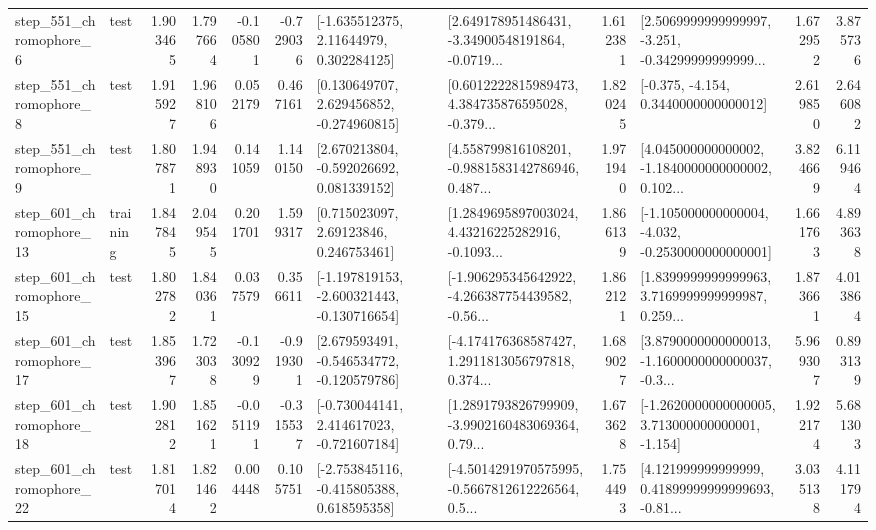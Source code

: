 \begin{tabular}{llrrrrllrlrr}
   step\_551\_chromophore\_6 &      test &      1.903465 &    1.797664 &     -0.105801 & -0.729036 &     [-1.635512375, 2.11644979, 0.302284125] &  [2.649178951486431, -3.34900548191864, -0.0719... &       1.612381 &  [2.5069999999999997, -3.251, -0.34299999999999... &            1.672952 &          3.875736 \\
   step\_551\_chromophore\_8 &      test &      1.915927 &    1.968106 &      0.052179 &  0.467161 &    [0.130649707, 2.629456852, -0.274960815] &  [0.6012222815989473, 4.384735876595028, -0.379... &       1.820245 &               [-0.375, -4.154, 0.3440000000000012] &            2.619850 &          2.646082 \\
   step\_551\_chromophore\_9 &      test &      1.807871 &    1.948930 &      0.141059 &  1.140150 &    [2.670213804, -0.592026692, 0.081339152] &  [4.558799816108201, -0.9881583142786946, 0.487... &       1.971940 &  [4.045000000000002, -1.1840000000000002, 0.102... &            3.824669 &          6.119464 \\
  step\_601\_chromophore\_13 &  training &      1.847845 &    2.049545 &      0.201701 &  1.599317 &      [0.715023097, 2.69123846, 0.246753461] &  [1.2849695897003024, 4.43216225282916, -0.1093... &       1.866139 &  [-1.105000000000004, -4.032, -0.2530000000000001] &            1.661763 &          4.893638 \\
  step\_601\_chromophore\_15 &      test &      1.802782 &    1.840361 &      0.037579 &  0.356611 &  [-1.197819153, -2.600321443, -0.130716654] &  [-1.906295345642922, -4.266387754439582, -0.56... &       1.862121 &  [1.8399999999999963, 3.7169999999999987, 0.259... &            1.873661 &          4.013864 \\
  step\_601\_chromophore\_17 &      test &      1.853967 &    1.723038 &     -0.130929 & -0.919301 &   [2.679593491, -0.546534772, -0.120579786] &  [-4.174176368587427, 1.2911813056797818, 0.374... &       1.689027 &  [3.8790000000000013, -1.1600000000000037, -0.3... &            5.969307 &          0.893139 \\
  step\_601\_chromophore\_18 &      test &      1.902812 &    1.851621 &     -0.051191 & -0.315537 &   [-0.730044141, 2.414617023, -0.721607184] &  [1.2891793826799909, -3.9902160483069364, 0.79... &       1.673628 &   [-1.2620000000000005, 3.713000000000001, -1.154] &            1.922174 &          5.681303 \\
  step\_601\_chromophore\_22 &      test &      1.817014 &    1.821462 &      0.004448 &  0.105751 &   [-2.753845116, -0.415805388, 0.618595358] &  [-4.5014291970575995, -0.5667812612226564, 0.5... &       1.754493 &  [4.121999999999999, 0.41899999999999693, -0.81... &            3.035138 &          4.111794 \\

\end{tabular}
